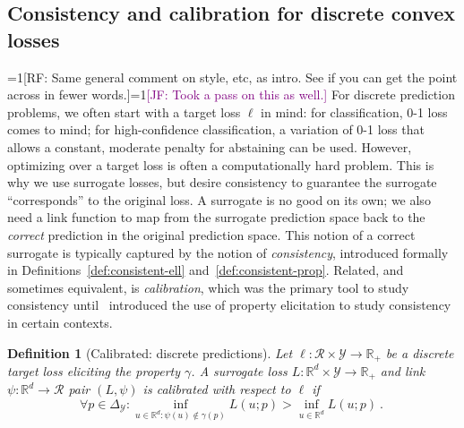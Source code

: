 \documentclass{article}
\newcommand{\Comments}{1}
\newcommand{\mynote}[2]{\ifnum\Comments=1\textcolor{#1}{#2}\fi}
\newcommand{\mytodo}[2]{\ifnum\Comments=1%
	\todo[linecolor=#1!80!black,backgroundcolor=#1,bordercolor=#1!80!black]{#2}\fi}
\newcommand{\raf}[1]{\mynote{green!80!blue}{[RF: #1]}}
\newcommand{\raft}[1]{\mytodo{green!20!white}{RF: #1}}
\newcommand{\jessie}[1]{\mynote{purple}{[JF: #1]}}
\newcommand{\reals}{\mathbb{R}}
\newcommand{\simplex}{\Delta_\Y}
\newcommand{\R}{\mathcal{R}}
\newcommand{\Y}{\mathcal{Y}}
\newtheorem{definition}{Definition}
\begin{document}
\subsection{Consistency and calibration for discrete convex losses}\label{subsec:convex-surrogates}

\raf{Same general comment on style, etc, as intro.  See if you can get the point across in fewer words.}\jessie{Took a pass on this as well.}
For discrete prediction problems, we often start with a target loss $\ell$ in mind: for classification, 0-1 loss comes to mind; for high-confidence classification, a variation of 0-1 loss that allows a constant, moderate penalty for abstaining can be used.
However, optimizing over a target loss is often a computationally hard problem.
This is why we use surrogate losses, but desire consistency to guarantee the surrogate ``corresponds'' to the original loss.%
A surrogate is no good on its own; we also need a link function to map from the surrogate prediction space back to the \emph{correct} prediction in the original prediction space.
This notion of a correct surrogate is typically captured by the notion of \emph{consistency}, introduced formally in Definitions~\ref{def:consistent-ell} and~\ref{def:consistent-prop}.
Related, and sometimes equivalent, is \emph{calibration}, which was the primary tool to study consistency until~\cite{agarwal2015consistent} introduced the use of property elicitation to study consistency in certain contexts.

\begin{definition}[Calibrated: discrete predictions]\label{def:calibrated-finite}
	Let $\ell : \R \times \Y \to \reals_+$ be a discrete target loss eliciting the property $\gamma$.
	A surrogate loss $L : \reals^d \times \Y \to \reals_+$  and link $\psi:\reals^d \to \R$ pair $(L, \psi)$ is \emph{calibrated} with respect to $\ell$ if 
	\begin{equation}\label{eq:calibration}
	\forall p \in \simplex: \inf_{u \in \reals^d : \psi(u) \not \in \gamma(p)} L(u;p) > \inf_{u \in \reals^d} L(u;p)~.~
	\end{equation}
\end{definition}
\end{document}
